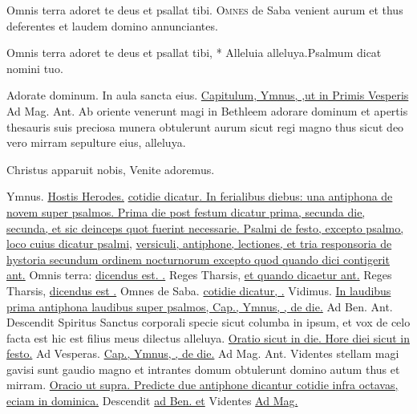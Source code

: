 \begin{multicols*}{2}
\V Omnis terra adoret te deus et psallat tibi.
\lettrine[lines=2]{\zallmancaps \color{Blue} O}{mnes} de Saba venient aurum et thus deferentes et laudem domino annunciantes.
\begin{responsory-breve}
{Omnis terra adoret te deus et psallat tibi, * Alleluia alleluya.}{Psalmum dicat nomini tuo.}
\end{responsory-breve}
\V Adorate dominum. \R In aula sancta eius.
 \ul{Capitulum, Ymnus, \Vbar ,ut in Primis Vesperis} {\color{Red} Ad Mag. Ant.} Ab oriente venerunt magi in Bethleem adorare dominum et apertis thesauris suis preciosa munera obtulerunt aurum sicut regi magno thus sicut deo vero mirram sepulture eius, alleluya.
{\color{Red} }
\par {}
\begin{invitatory}
{Christus apparuit nobis, Venite adoremus.}
\end{invitatory}
{\color{Red} Ymnus.} \hyperlink{hostis-herodes}{Hostis Herodes.} \ul{cotidie dicatur. In ferialibus diebus: una antiphona de novem super psalmos. Prima die post festum dicatur prima, secunda die, secunda, et sic deinceps quot fuerint necessarie. Psalmi de festo, excepto psalmo,}  \ul{loco cuius dicatur psalmi,}  \ul{versiculi, antiphone, lectiones, et tria responsoria de hystoria secundum ordinem nocturnorum excepto quod quando dici contigerit ant.} Omnis terra: \ul{dicendus est. \Vbar .} Reges Tharsis, \ul{et quando dicaetur ant.} Reges Tharsis, \ul{dicendus est \Vbar .} Omnes de Saba.  \ul{cotidie dicatur, \Vbar .} Vidimus. \ul{In laudibus prima antiphona laudibus super psalmos, Cap., Ymnus, \Vbar , de die.} {\color{Red} Ad Ben. Ant.} Descendit Spiritus Sanctus corporali specie sicut columba in ipsum, et vox de celo facta est hic est filius meus dilectus alleluya. \ul{Oratio sicut in die. Hore diei sicut in festo.} {\color{Red} Ad Vesperas.} \ul{Cap., Ymnus, \Vbar , de die.} {\color{Red} Ad Mag. Ant.} Videntes stellam magi gavisi sunt gaudio magno et intrantes domum obtulerunt domino autum thus et mirram. \ul{Oracio ut supra. Predicte due antiphone dicantur cotidie infra octavas, eciam in dominica.} Descendit \ul{ad Ben. et} Videntes \ul{Ad Mag.}

\end{multicols*}
